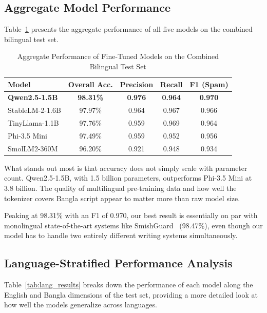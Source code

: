 \documentclass[journal]{IEEEtran}
\begin{document}
\subsection{Aggregate Model Performance}

Table~\ref{tab:aggregate_results} presents the aggregate performance of all five models on the combined bilingual test set.

\begin{table}[htbp]
\caption{Aggregate Performance of Fine-Tuned Models on the Combined Bilingual Test Set}
\label{tab:aggregate_results}
\centering
\begin{tabular}{lcccc}
\toprule
\textbf{Model} & \textbf{Overall Acc.} & \textbf{Precision} & \textbf{Recall} & \textbf{F1 (Spam)} \\
\midrule
\textbf{Qwen2.5-1.5B} & \textbf{98.31\%} & \textbf{0.976} & \textbf{0.964} & \textbf{0.970} \\
StableLM-2-1.6B & 97.97\% & 0.964 & 0.967 & 0.966 \\
TinyLlama-1.1B & 97.76\% & 0.959 & 0.969 & 0.964 \\
Phi-3.5 Mini & 97.49\% & 0.959 & 0.952 & 0.956 \\
SmolLM2-360M & 96.20\% & 0.921 & 0.948 & 0.934 \\
\bottomrule
\end{tabular}
\end{table}

What stands out most is that accuracy does not simply scale with parameter count. Qwen2.5-1.5B, with 1.5 billion parameters, outperforms Phi-3.5 Mini at 3.8 billion. The quality of multilingual pre-training data and how well the tokenizer covers Bangla script appear to matter more than raw model size.

Peaking at 98.31\% with an F1 of 0.970, our best result is essentially on par with monolingual state-of-the-art systems like SmishGuard~\cite{ref6} (98.47\%), even though our model has to handle two entirely different writing systems simultaneously.

\subsection{Language-Stratified Performance Analysis}

Table~\ref{tab:lang_results} breaks down the performance of each model along the English and Bangla dimensions of the test set, providing a more detailed look at how well the models generalize across languages.
\end{document}
